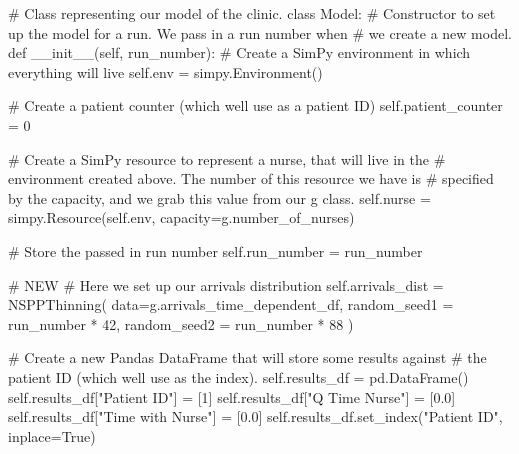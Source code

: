 \documentclass[
  letterpaper,
  DIV=11,
  numbers=noendperiod]{scrreprt}
\newenvironment{Shaded}{\begin{snugshade}}{\end{snugshade}}
\newcommand{\CommentTok}[1]{\textcolor[rgb]{0.37,0.37,0.37}{#1}}
\newcommand{\DecValTok}[1]{\textcolor[rgb]{0.68,0.00,0.00}{#1}}
\newcommand{\FloatTok}[1]{\textcolor[rgb]{0.68,0.00,0.00}{#1}}
\newcommand{\FunctionTok}[1]{\textcolor[rgb]{0.28,0.35,0.67}{#1}}
\newcommand{\KeywordTok}[1]{\textcolor[rgb]{0.00,0.23,0.31}{#1}}
\newcommand{\NormalTok}[1]{\textcolor[rgb]{0.00,0.23,0.31}{#1}}
\newcommand{\OperatorTok}[1]{\textcolor[rgb]{0.37,0.37,0.37}{#1}}
\newcommand{\StringTok}[1]{\textcolor[rgb]{0.13,0.47,0.30}{#1}}
\newcommand{\VariableTok}[1]{\textcolor[rgb]{0.07,0.07,0.07}{#1}}
\begin{document}
\begin{tcolorbox}
\begin{Shaded}
\begin{Highlighting}[]
\CommentTok{\# Class representing our model of the clinic.}
\KeywordTok{class}\NormalTok{ Model:}
    \CommentTok{\# Constructor to set up the model for a run.  We pass in a run number when}
    \CommentTok{\# we create a new model.}
    \KeywordTok{def} \FunctionTok{\_\_init\_\_}\NormalTok{(}\VariableTok{self}\NormalTok{, run\_number):}
        \CommentTok{\# Create a SimPy environment in which everything will live}
        \VariableTok{self}\NormalTok{.env }\OperatorTok{=}\NormalTok{ simpy.Environment()}

        \CommentTok{\# Create a patient counter (which we\textquotesingle{}ll use as a patient ID)}
        \VariableTok{self}\NormalTok{.patient\_counter }\OperatorTok{=} \DecValTok{0}

        \CommentTok{\# Create a SimPy resource to represent a nurse, that will live in the}
        \CommentTok{\# environment created above.  The number of this resource we have is}
        \CommentTok{\# specified by the capacity, and we grab this value from our g class.}
        \VariableTok{self}\NormalTok{.nurse }\OperatorTok{=}\NormalTok{ simpy.Resource(}\VariableTok{self}\NormalTok{.env, capacity}\OperatorTok{=}\NormalTok{g.number\_of\_nurses)}

        \CommentTok{\# Store the passed in run number}
        \VariableTok{self}\NormalTok{.run\_number }\OperatorTok{=}\NormalTok{ run\_number}

        \CommentTok{\# NEW}
        \CommentTok{\# Here we set up our arrivals distribution}
        \VariableTok{self}\NormalTok{.arrivals\_dist }\OperatorTok{=}\NormalTok{ NSPPThinning(}
\NormalTok{          data}\OperatorTok{=}\NormalTok{g.arrivals\_time\_dependent\_df,}
\NormalTok{          random\_seed1 }\OperatorTok{=}\NormalTok{ run\_number }\OperatorTok{*} \DecValTok{42}\NormalTok{,}
\NormalTok{          random\_seed2 }\OperatorTok{=}\NormalTok{ run\_number }\OperatorTok{*} \DecValTok{88}
\NormalTok{        )}


        \CommentTok{\# Create a new Pandas DataFrame that will store some results against}
        \CommentTok{\# the patient ID (which we\textquotesingle{}ll use as the index).}
        \VariableTok{self}\NormalTok{.results\_df }\OperatorTok{=}\NormalTok{ pd.DataFrame()}
        \VariableTok{self}\NormalTok{.results\_df[}\StringTok{"Patient ID"}\NormalTok{] }\OperatorTok{=}\NormalTok{ [}\DecValTok{1}\NormalTok{]}
        \VariableTok{self}\NormalTok{.results\_df[}\StringTok{"Q Time Nurse"}\NormalTok{] }\OperatorTok{=}\NormalTok{ [}\FloatTok{0.0}\NormalTok{]}
        \VariableTok{self}\NormalTok{.results\_df[}\StringTok{"Time with Nurse"}\NormalTok{] }\OperatorTok{=}\NormalTok{ [}\FloatTok{0.0}\NormalTok{]}
        \VariableTok{self}\NormalTok{.results\_df.set\_index(}\StringTok{"Patient ID"}\NormalTok{, inplace}\OperatorTok{=}\VariableTok{True}\NormalTok{)}


\end{Highlighting}
\end{Shaded}
\end{tcolorbox}
\end{document}
